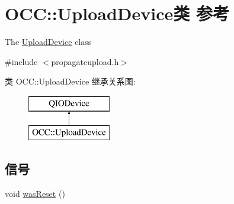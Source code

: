 \hypertarget{class_o_c_c_1_1_upload_device}{}\section{O\+CC\+:\+:Upload\+Device类 参考}
\label{class_o_c_c_1_1_upload_device}


The \hyperlink{class_o_c_c_1_1_upload_device}{Upload\+Device} class  




{\ttfamily \#include $<$propagateupload.\+h$>$}

类 O\+CC\+:\+:Upload\+Device 继承关系图\+:\begin{figure}[H]
\begin{center}
\leavevmode
\includegraphics[height=2.000000cm]{class_o_c_c_1_1_upload_device}
\end{center}
\end{figure}
\subsection*{信号}
\begin{DoxyCompactItemize}
\item 
void \hyperlink{class_o_c_c_1_1_upload_device_a9799bf9895901f26f26d6032e900df11}{was\+Reset} ()
\end{DoxyCompactItemize}
